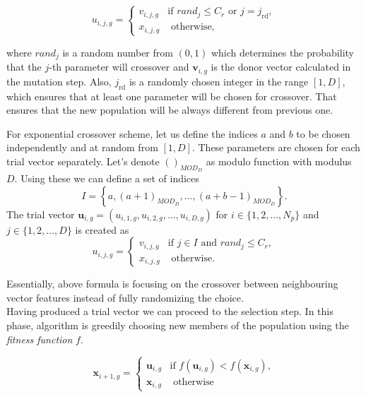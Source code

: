 \documentclass[12pt,a4paper,openany]{book}
\begin{document}
\begin{equation}
u_{i, j, g}=\left\{\begin{array}{ll}
v_{i, j, g} & \text{if } rand_{j} \leqslant C_{r} \text { or } j=j_{\mathrm{rd}}, \\
x_{i, j, g} & \text { otherwise,}
\end{array}\right.
\end{equation}

\noindent where $rand_{j}$ is a random number from $(0,1)$ which determines the probability that the $j$-th parameter will crossover and $\mathbf{v}_{i, g}$ is the donor vector calculated in the mutation step. Also, $j_{\mathrm{rd}}$ is a randomly chosen integer in the range $[1, D]$, which ensures that at least one parameter will be chosen for crossover. That ensures that the new population will be always different from previous one.\

\noindent For exponential crossover scheme, let us define the indices $a$ and $b$ to be chosen independently and at random from $[1, D]$. These parameters are chosen for each trial vector separately. Let's denote $\left(\right)_{MOD_{D}}$ as modulo function with modulus $D$. Using these we can define a set of indices
\begin{equation}
I = \left\lbrace a, \left(a+1\right)_{MOD_{D}}, \ldots, \left(a+b-1\right)_{MOD_{D}}\right\rbrace.
\end{equation}
The trial vector $\mathbf{u}_{i, g}=\left(u_{i, 1, g}, u_{i, 2, g}, \ldots, u_{i, D, g}\right)$ for $i \in \{1, 2, ..., N_{p}\}$ and $j \in \{1, 2, ..., D\}$ is created as
\begin{equation}
u_{i, j, g}=\left\{\begin{array}{cc}
v_{i, j, g} & \text {if } j \in I \text { and } rand_{j} \leqslant C_{r}, \\
x_{i, j, g} & \text { otherwise. }
\end{array}\right.
\end{equation}

\noindent Essentially, above formula is focusing on the crossover between neighbouring vector features instead of fully randomizing the choice.\\
\noindent Having produced a trial vector we can proceed to the selection step. In this phase, algorithm is greedily choosing new members of the population using the \textit{fitness function} $f$.

\begin{equation}
\mathbf{x}_{i+1, g}=\left\{\begin{array}{ll}
\mathbf{u}_{i, g} & \text {if } f\left(\mathbf{u}_{i, g}\right)<f\left(\mathbf{x}_{i, g}\right), \\
\mathbf{x}_{i, g} & \text { otherwise }
\end{array}\right.
\end{equation}
\end{document}
